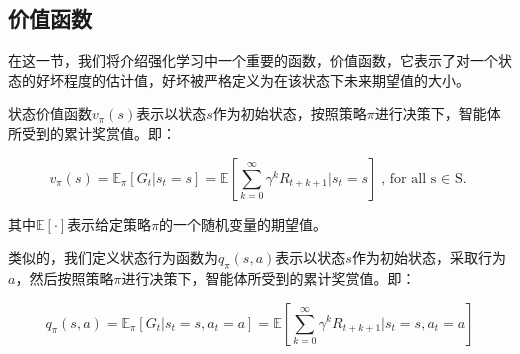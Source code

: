\documentclass{standalone}
\begin{document}
\subsection{价值函数}
在这一节，我们将介绍强化学习中一个重要的函数，价值函数，它表示了对一个状态的好坏程度的估计值，好坏被严格定义为在该状态下未来期望值的大小。\par
状态价值函数$v_{\pi}(s)$表示以状态$s$作为初始状态，按照策略$\pi$进行决策下，智能体所受到的累计奖赏值。即：
\begin{center}
    \begin{equation}
        v_{\pi}(s) = \mathbb{E}_{\pi}[G_t|s_t=s] = \mathbb{E}[\sum_{k=0}^{\infty}{\gamma^k{R_{t+k+1}}}|s_t=s]
        \mbox{, for all s $\in$ S.}
    \end{equation}
\end{center}
其中$\mathbb{E[\cdot]}$表示给定策略$\pi$的一个随机变量的期望值。
\par
类似的，我们定义状态行为函数为$q_{\pi}(s,a)$表示以状态$s$作为初始状态，采取行为$a$，然后按照策略$\pi$进行决策下，智能体所受到的累计奖赏值。即：
\begin{center}
    \begin{equation}
        q_{\pi}(s,a) = \mathbb{E}_{\pi}[G_t|s_t=s, a_t=a] = \mathbb{E}[\sum_{k=0}^{\infty}{\gamma^k{R_{t+k+1}}}|s_t=s, a_t=a]
    \end{equation}
    
\end{center}
\end{document}
